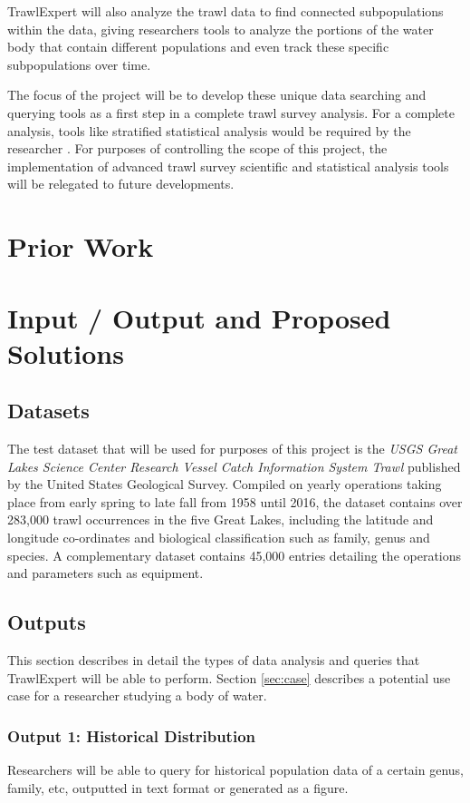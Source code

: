 \documentclass{article}
\begin{document}
TrawlExpert will also analyze the trawl data to find connected subpopulations within the data, giving researchers  tools to analyze the portions of the water body that contain different populations and even track these specific subpopulations over time.

The focus of the project will be to develop these unique data searching and querying tools as a first step in a complete trawl survey analysis. For a complete analysis, tools like stratified statistical analysis would be required by the researcher \citep{walsh1997efficiency}. For purposes of controlling the scope of this project, the implementation of advanced trawl survey scientific and statistical analysis tools will be relegated to future developments.

\section{Prior Work}

\section{Input / Output and Proposed Solutions}
\subsection{Datasets}\label{sec:out}
The test dataset that will be used for purposes of this project is the \textit{USGS Great Lakes Science Center Research Vessel Catch Information System Trawl} published by the United States Geological Survey. Compiled on yearly operations taking place from early spring to late fall from 1958 until 2016, the dataset contains over 283,000 trawl occurrences in the five Great Lakes, including the latitude and longitude co-ordinates and biological classification such as family, genus and species. A complementary dataset contains 45,000 entries detailing the operations and parameters such as equipment.

\subsection{Outputs}

This section describes in detail the types of data analysis and queries that TrawlExpert will be able to perform. Section \ref{sec:case} describes a potential use case for a researcher studying a body of water.

\subsubsection{Output 1: Historical Distribution}
Researchers will be able to query for historical population data of a certain genus, family, etc, outputted in text format or generated as a figure.
\end{document}

